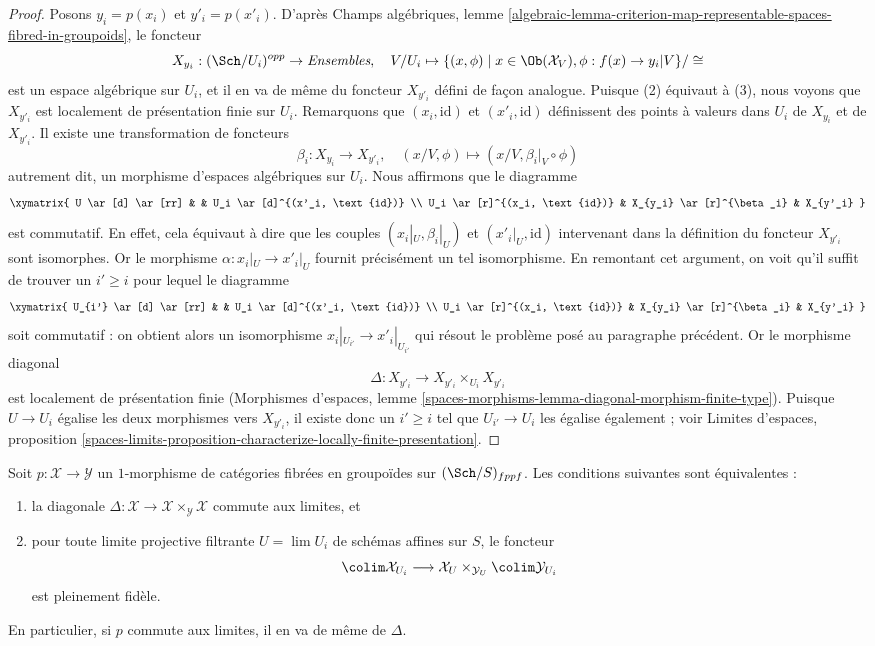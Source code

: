 \begin{proof}
\medskip\noindent
Posons $y_i = p(x_i)$ et $y'_i = p(x'_i)$. D'après Champs algébriques,
lemme
\ref{algebraic-lemma-criterion-map-representable-spaces-fibred-in-groupoids},
le foncteur
$$
X_{y_i} : (\Sch/U_i)^{opp} \to \textit{Ensembles},\quad
V/U_i \mapsto
\{(x, \phi) \mid x \in \Ob(\mathcal{X}_V), \phi : f(x) \to y_i|V\}/\cong
$$
est un espace algébrique sur $U_i$, et il en va de même du foncteur
$X_{y'_i}$ défini de façon analogue. Puisque (2) équivaut à (3), nous voyons
que $X_{y'_i}$ est localement de présentation finie sur $U_i$. Remarquons que
$(x_i, \text{id})$ et $(x'_i, \text{id})$ définissent des points à valeurs
dans $U_i$ de $X_{y_i}$ et de $X_{y'_i}$. Il existe une transformation de
foncteurs
$$
\beta_i : X_{y_i} \to X_{y'_i},\quad
(x/V, \phi) \mapsto (x/V, \beta_i|_V \circ \phi)
$$
autrement dit, un morphisme d'espaces algébriques sur $U_i$. Nous affirmons
que le diagramme
$$
\xymatrix{
U \ar[d] \ar[rr] & & U_i \ar[d]^{(x'_i, \text{id})} \\
U_i \ar[r]^{(x_i, \text{id})} & X_{y_i} \ar[r]^{\beta_i} & X_{y'_i}
}
$$
est commutatif. En effet, cela équivaut à dire que les couples
$(x_i|_U, \beta_i|_U)$ et $(x'_i|_U, \text{id})$ intervenant dans la
définition du foncteur $X_{y'_i}$ sont isomorphes. Or le morphisme
$\alpha : x_i|_U \to x'_i|_U$ fournit précisément un tel isomorphisme. En
remontant cet argument, on voit qu'il suffit de trouver un $i' \geq i$ pour
lequel le diagramme
$$
\xymatrix{
U_{i'} \ar[d] \ar[rr] & & U_i \ar[d]^{(x'_i, \text{id})} \\
U_i \ar[r]^{(x_i, \text{id})} & X_{y_i} \ar[r]^{\beta_i} & X_{y'_i}
}
$$
soit commutatif : on obtient alors un isomorphisme
$x_i|_{U_{i'}} \to x'_i|_{U_{i'}}$ qui résout le problème posé au paragraphe
précédent. Or le morphisme diagonal
$$
\Delta : X_{y'_i} \to X_{y'_i} \times_{U_i} X_{y'_i}
$$
est localement de présentation finie (Morphismes d'espaces, lemme
\ref{spaces-morphisms-lemma-diagonal-morphism-finite-type}). Puisque
$U \to U_i$ égalise les deux morphismes vers $X_{y'_i}$, il existe donc un
$i' \geq i$ tel que $U_{i'} \to U_i$ les égalise également ; voir Limites
d'espaces, proposition
\ref{spaces-limits-proposition-characterize-locally-finite-presentation}.
\end{proof}

\begin{lemma}
\label{lemma-limit-preserving-diagonal}
Soit $p : \mathcal{X} \to \mathcal{Y}$ un $1$-morphisme de catégories
fibrées en groupoïdes sur $(\Sch/S)_{fppf}$. Les conditions suivantes sont
équivalentes :
\begin{enumerate}
\item la diagonale
$\Delta : \mathcal{X} \to \mathcal{X} \times_\mathcal{Y} \mathcal{X}$
commute aux limites, et
\item pour toute limite projective filtrante $U = \lim U_i$ de schémas
affines sur $S$, le foncteur
$$
\colim \mathcal{X}_{U_i} \longrightarrow
\mathcal{X}_U \times_{\mathcal{Y}_U} \colim \mathcal{Y}_{U_i}
$$
est pleinement fidèle.
\end{enumerate}
En particulier, si $p$ commute aux limites, il en va de même de $\Delta$.
\end{lemma}

